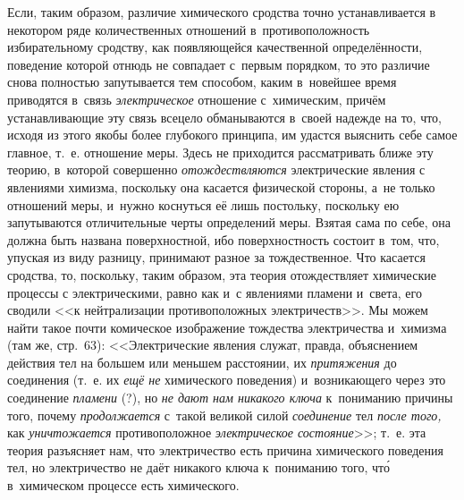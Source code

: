 Если, таким образом, различие химического сродства точно устанавливается в
некотором ряде количественных отношений в~противоположность избирательному
сродству, как появляющейся качественной определённости, поведение которой отнюдь не совпадает с~первым
порядком, то это различие снова полностью запутывается тем способом, каким
в~новейшее время приводятся в~связь {\em электрическое} отношение с~химическим,
причём устанавливающие эту связь всецело обманываются в~своей надежде на то,
что, исходя из этого якобы более глубокого принципа, им удастся выяснить себе
самое главное, т.~е. отношение меры. Здесь не приходится рассматривать ближе
эту теорию, в~которой совершенно {\em отождествляются} электрические явления с
явлениями химизма, поскольку она касается физической стороны, а~не только
отношений меры, и~нужно коснуться её лишь постольку, поскольку ею запутываются
отличительные черты определений меры. Взятая сама по себе, она должна быть
названа поверхностной, ибо поверхностность состоит в~том, что, упуская из виду
разницу, принимают разное за тождественное. Что касается сродства, то,
поскольку, таким образом, эта теория отождествляет химические процессы с
электрическими, равно как и~с явлениями пламени и~света, его сводили <<к
нейтрализации противоположных электричеств>>. Мы можем найти такое почти
комическое изображение тождества электричества и~химизма (там же, стр.~63):
<<Электрические явления служат, правда, объяснением действия тел на большем или
меньшем расстоянии, их {\em притяжения} до соединения (т.~е. их {\em ещё не}
химического поведения) и~возникающего через это соединение {\em пламени} (?),
но {\em не дают нам никакого ключа} к~пониманию причины того, почему
{\em продолжается} с~такой великой силой {\em соединение} тел {\em после того,}
как {\em уничтожается} противоположное {\em электрическое состояние}>>; т.~е.
эта теория разъясняет нам, что электричество есть причина химического поведения
тел, но электричество не даёт никакого ключа к~пониманию того, чт\'{о}
в~химическом процессе есть химического.

